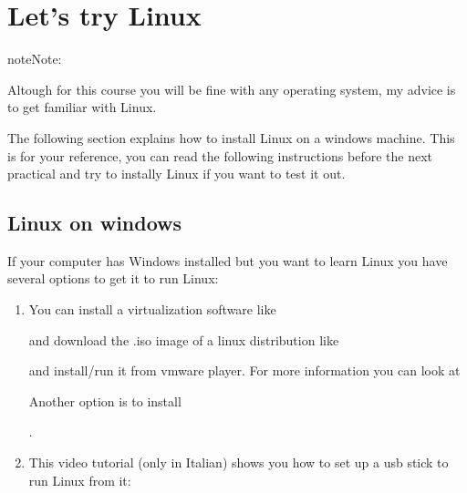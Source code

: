 \documentclass[letterpaper,10pt,english]{sphinxmanual}
\begin{document}
\section{Let’s try Linux}
\label{\detokenize{M1_practical1:Let's-try-Linux}}
\begin{sphinxadmonition}{note}{Note:}\par
\sphinxAtStartPar
Altough for this course you will be fine with any operating system, my advice is to get familiar with Linux.
\end{sphinxadmonition}

\sphinxAtStartPar
The following section explains how to install Linux on a windows machine. This is for your reference, you can read the following instructions before the next practical and try to instally Linux if you want to test it out.


\subsection{Linux on windows}
\label{\detokenize{M1_practical1:Linux-on-windows}}
\sphinxAtStartPar
If your computer has Windows installed but you want to learn Linux you have several options to get it to run Linux:
\begin{enumerate}
%
\item {} 
\sphinxAtStartPar
You can install a virtualization software like %
\begin{footnote}[14]\sphinxAtStartFootnote
{}
%
\end{footnote} and download the .iso image of a linux distribution like %
\begin{footnote}[15]\sphinxAtStartFootnote
{}
%
\end{footnote} and install/run it from vmware player. For more information you can look at %
\begin{footnote}[16]\sphinxAtStartFootnote
{}
%
\end{footnote} Another option is to install %
\begin{footnote}[17]\sphinxAtStartFootnote
{}
%
\end{footnote}.

\item {} 
\sphinxAtStartPar
This video tutorial (only in Italian) shows you how to set up a usb stick to run Linux from it: 

\end{enumerate}
\end{document}
